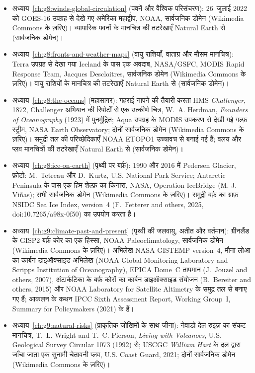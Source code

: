 \begin{itemize}
  \item अध्याय~\ref{ch:g8:winds-global-circulation} (पवनें और वैश्विक परिसंचरण): 26~जुलाई 2022 को GOES-16 उपग्रह से देखे गए अमेरिका महाद्वीप, NOAA, सार्वजनिक डोमेन (Wikimedia Commons के ज़रिए)। व्यापारिक पवनों के मानचित्र की तटरेखाएँ Natural Earth से (सार्वजनिक डोमेन)।
  \item अध्याय~\ref{ch:g8:fronts-and-weather-maps} (वायु राशियाँ, वाताग्र और मौसम मानचित्र): Terra उपग्रह से देखा गया Iceland के पास एक अवदाब, NASA/GSFC, MODIS Rapid Response Team, Jacques Descloitres, सार्वजनिक डोमेन (Wikimedia Commons के ज़रिए)। वायु राशियों के मानचित्र की तटरेखाएँ Natural Earth से (सार्वजनिक डोमेन)।
  \item अध्याय~\ref{ch:g8:the-oceans} (महासागर): गहराई नापने की तैयारी करता HMS \emph{Challenger}, 1872, Challenger अभियान की रिपोर्टों से एक उत्कीर्ण चित्र, W.~A. Herdman, \emph{Founders of Oceanography} (1923) में पुनर्मुद्रित; Aqua उपग्रह के MODIS उपकरण से देखी गई गल्फ़ स्ट्रीम, NASA Earth Observatory; दोनों सार्वजनिक डोमेन (Wikimedia Commons के ज़रिए)। समुद्री तल की परिच्छेदिकाएँ NOAA ETOPO1 उच्चावच से बनाई गई हैं; वलय और प्लव मानचित्रों की तटरेखाएँ Natural Earth से (सार्वजनिक डोमेन)।
  \item अध्याय~\ref{ch:g8:ice-on-earth} (पृथ्वी पर बर्फ़): 1990 और 2016 में Pedersen Glacier, फ़ोटो: M.~Tetreau और D.~Kurtz, U.S. National Park Service; Antarctic Peninsula के पास एक हिम शेल्फ़ का किनारा, NASA, Operation IceBridge (M.-J. Viñas); सभी सार्वजनिक डोमेन (Wikimedia Commons के ज़रिए)। समुद्री बर्फ़ का ग्राफ़ NSIDC Sea Ice Index, version~4 (F.~Fetterer and others, 2025, doi:10.7265/a98x-0f50) का उपयोग करता है।
  \item अध्याय~\ref{ch:g9:climate-past-and-present} (पृथ्वी की जलवायु, अतीत और वर्तमान): ग्रीनलैंड के GISP2 बर्फ़ कोर का एक हिस्सा, NOAA Paleoclimatology, सार्वजनिक डोमेन (Wikimedia Commons के ज़रिए)। अभिलेख NASA GISTEMP version~4, मौना लोआ का कार्बन डाइऑक्साइड अभिलेख (NOAA Global Monitoring Laboratory and Scripps Institution of Oceanography), EPICA Dome~C तापमान (J.~Jouzel and others, 2007), अंटार्कटिका के बर्फ़ कोरों का कार्बन डाइऑक्साइड संयोजन (B.~Bereiter and others, 2015) और NOAA Laboratory for Satellite Altimetry के समुद्र तल से बनाए गए हैं; आकलन के कथन IPCC Sixth Assessment Report, Working Group~I, Summary for Policymakers (2021) के हैं।
  \item अध्याय~\ref{ch:g9:natural-risks} (प्राकृतिक जोखिमों के साथ जीना): नेवाडो देल रुइज़ का संकट मानचित्र, T.~L. Wright and T.~C. Pierson, \emph{Living with Volcanoes}, U.S. Geological Survey Circular 1073 (1992) से; USCGC \emph{William Hart} के दल द्वारा जाँचा जाता एक सुनामी चेतावनी प्लव, U.S. Coast Guard, 2021; दोनों सार्वजनिक डोमेन (Wikimedia Commons के ज़रिए)।

\end{itemize}

